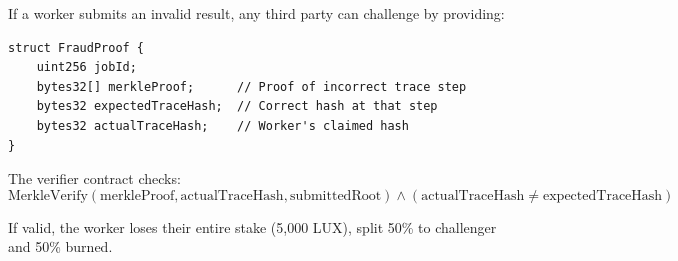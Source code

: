 If a worker submits an invalid result, any third party can challenge by providing:

\begin{lstlisting}[caption={Fraud Proof Structure}]
struct FraudProof {
    uint256 jobId;
    bytes32[] merkleProof;      // Proof of incorrect trace step
    bytes32 expectedTraceHash;  // Correct hash at that step
    bytes32 actualTraceHash;    // Worker's claimed hash
}
\end{lstlisting}

The verifier contract checks:
\begin{equation}
\text{MerkleVerify}(\text{merkleProof}, \text{actualTraceHash}, \text{submittedRoot}) \land (\text{actualTraceHash} \neq \text{expectedTraceHash})
\end{equation}

If valid, the worker loses their entire stake (5,000 LUX), split 50\% to challenger and 50\% burned.

